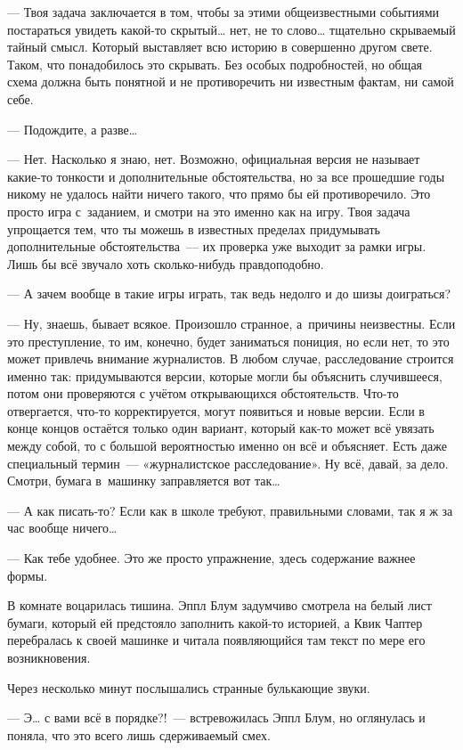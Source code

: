 \documentclass[fontsize=11pt,a5paper,titlepage=firstcover]{scrbook}
\begin{document}
--- Твоя задача заключается в том, чтобы за этими общеизвестными событиями постараться увидеть какой-то скрытый{\ldots} нет, не то слово{\ldots} тщательно скрываемый тайный смысл. Который выставляет всю историю в совершенно другом свете. Таком, что понадобилось это скрывать. Без особых подробностей, но общая схема должна быть понятной и не противоречить ни известным фактам, ни самой себе.

--- Подождите, а разве{\ldots}

--- Нет. Насколько я знаю, нет. Возможно, официальная версия не называет какие-то тонкости и дополнительные обстоятельства, но за все прошедшие годы никому не удалось найти ничего такого, что прямо бы ей противоречило. Это просто игра с~заданием, и смотри на это именно как на игру. Твоя задача упрощается тем, что ты можешь в известных пределах придумывать дополнительные обстоятельства~--- их проверка уже выходит за рамки игры. Лишь бы всё звучало хоть сколько-нибудь правдоподобно.

--- А зачем вообще в такие игры играть, так ведь недолго и до шизы доиграться?

--- Ну, знаешь, бывает всякое. Произошло странное, а~причины неизвестны. Если это преступление, то им, конечно, будет заниматься пониция, но если нет, то это может привлечь внимание журналистов. В любом случае, расследование строится именно так: придумываются версии, которые могли бы объяснить случившееся, потом они проверяются с учётом открывающихся обстоятельств. Что-то отвергается, что-то корректируется, могут появиться и новые версии. Если в конце концов остаётся только один вариант, который как-то может всё увязать между собой, то с большой вероятностью именно он всё и объясняет. Есть даже специальный термин~--- «журналистское расследование». Ну всё, давай, за дело. Смотри, бумага в~машинку заправляется вот так{\ldots}

--- А как писать-то? Если как в школе требуют, правильными словами, так я ж за час вообще ничего{\ldots}

--- Как тебе удобнее. Это же просто упражнение, здесь содержание важнее формы.

В комнате воцарилась тишина. Эппл Блум задумчиво смотрела на белый лист бумаги, который ей предстояло заполнить какой-то историей, а Квик Чаптер перебралась к своей машинке и читала появляющийся там текст по мере его возникновения.

Через несколько минут послышались странные булькающие звуки.

--- Э{\ldots} с вами всё в порядке?!~--- встревожилась Эппл Блум, но оглянулась и поняла, что это всего лишь сдерживаемый смех.
\end{document}
